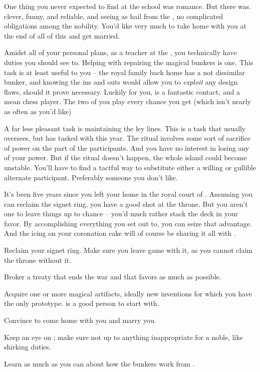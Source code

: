 \documentclass[char]{GL2020}
\begin{document}
One thing you never expected to find at the school was romance. But there \cPirate{} was. \cPirate{\They} \cPirate{\are} clever, funny, and reliable, and seeing as \cPirate{\they} hail\cPirate{\plural} from the \pShip{}, \cPirate{\have} no complicated obligations among the \pFarm{} nobility. You’d like very much to take \cPirate{} home with you at the end of all of this and get married.

Amidst all of your personal plans, as a teacher at the \pSc{}, you technically have duties you should see to. Helping \cBunker{} with repairing the magical bunkers is one. This task is at least useful to you -- the royal family back home has a not dissimilar bunker, and knowing the ins and outs would allow you to \emph{exploit} any design flaws, should it prove necessary. Luckily for you, \cBunker{} is a fantastic contact, and a mean chess player. The two of you play every chance you get (which isn’t nearly as often as you’d like)

A far less pleasant task is maintaining the ley lines. This is a task that \cPrincipal{} usually oversees, but has tasked \cBeetle{} with this year. The ritual involves some sort of sacrifice of power on the part of the participants. And you have no interest in losing any of your power. But if the ritual doesn’t happen, the whole island could become unstable. You’ll have to find a tactful way to substitute either a willing or gullible alternate participant. Preferably someone you don’t like.

It’s been five years since you left your home in the royal court of \pFarm{}. Assuming you can reclaim the signet ring, you have a good shot at the throne. But you aren’t one to leave things up to chance -- you’d much rather stack the deck in your favor. By accomplishing everything you set out to, you can seize that advantage. And the icing on your coronation cake will of course be sharing it all with \cPirate{}.

\begin{itemz}[Goals]
	\item Reclaim your signet ring. Make sure you leave game with it, as you cannot claim the \pFarm{} throne without it.
\item Broker a treaty that ends the war and that favors \pFarm{} as much as possible.
\item Acquire one or more magical artifacts, ideally new inventions for which you have the only prototype. \cCurse{} is a good person to start with.
\item Convince \cPirate{} to come home with you and marry you.
	\item Keep an eye on \cAdopted{}; make sure \cAdopted{\they} \cAdopted{\are} not up to anything inappropriate for a noble, like shirking \cAdopted{\their} duties.
\item Learn as much as you can about how the bunkers work from \cBunker{}. 
\end{itemz}
\end{document}
